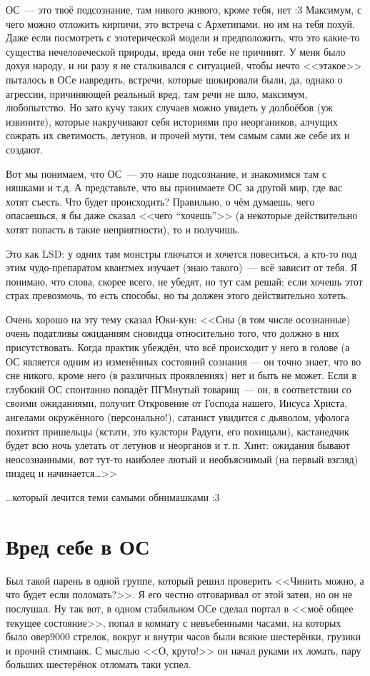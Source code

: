 \documentclass[a4paper,14pt,oneside]{memoir}
\begin{document}
\medskip
ОС~--- это твоё подсознание, там никого живого, кроме тебя, нет :3 Максимум, с чего можно отложить кирпичи, это встреча с Архетипами, но им на тебя похуй. Даже если посмотреть с эзотерической модели и предположить, что это какие-то существа нечеловеческой природы, вреда они тебе не причинят. У меня было дохуя народу, и ни разу я не сталкивался с ситуацией, чтобы нечто <<этакое>> пыталось в ОСе навредить, встречи, которые шокировали были, да, однако о агрессии, причиняющей реальный вред, там речи не шло, максимум, любопытство. Но зато кучу таких случаев можно увидеть у долбоёбов (уж извините), которые накручивают себя историями про неоргаников, алчущих сожрать их светимость, летунов, и прочей мути, тем самым сами же себе их и создают. 

Вот мы понимаем, что ОС~--- это наше подсознание, и знакомимся там с няшками и т.д. А представьте, что вы принимаете ОС за другой мир, где вас хотят съесть. Что будет происходить? Правильно, о чём думаешь, чего опасаешься, я бы даже сказал <<чего “хочешь”>> (а некоторые действительно хотят попасть в такие неприятности), то и получишь. 

Это как LSD: у одних там монстры глючатся и хочется повеситься, а кто-то под этим чудо-препаратом квантмех изучает (знаю такого)~--- всё зависит от тебя. Я понимаю, что слова, скорее всего, не убедят, но тут сам решай: если хочешь этот страх превозмочь, то есть способы, но ты должен этого действительно хотеть. 

Очень хорошо на эту тему сказал Юки-кун:
\smallskip 
<<Сны (в том числе осознанные) очень податливы ожиданиям сновидца относительно того, что должно в них присутствовать. Когда практик убеждён, что всё происходит у него в голове (а ОС является одним из изменённых состояний сознания — он точно знает, что во сне никого, кроме него (в различных проявлениях) нет и быть не может. Если в глубокий ОС спонтанно попадёт ПГМнутый товарищ~--- он, в соответствии со своими ожиданиями, получит Откровение от Господа нашего, Иисуса Христа, ангелами окружённого (персонально!), сатанист увидится с дьяволом, уфолога похитят пришельцы (кстати, это кулстори Радуги, его похищали), кастанедчик будет всю ночь улетать от летунов и неорганов и т.\,п. Хинт: ожидания бывают неосознанными, вот тут-то наиболее лютый и необъяснимый (на первый взгляд) пиздец и начинается\ldots>>

\ldots который лечится теми самыми обнимашками :3




\section{Вред себе в ОС}
Был такой парень в одной группе, который решил проверить <<Чинить можно, а что будет если поломать?>>. Я его честно отговаривал от этой затеи, но он не послушал. Ну так вот, в одном стабильном ОСе сделал портал в <<моё общее текущее состояние>>, попал в комнату с невъебенными часами, на которых было овер9000 стрелок, вокруг и внутри часов были всякие шестерёнки, грузики и прочий стимпанк. С мыслью <<О, круто!>> он начал руками их ломать, пару больших шестерёнок отломать таки успел.
 
\end{document}
